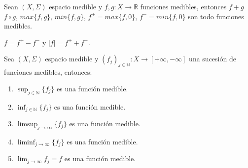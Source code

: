 \begin{corolario}
    Sean $(X, \Sigma)$ espacio medible y $f, g: X \to \mathbb{R}$ funciones medibles, entonces $f + g$ $f \circ g$, $max\{f, g\}$, $min\{f, g\}$, $f^+=max\{f, 0\}$, $f^- = min\{f, 0\}$ son todo funciones medibles.
\end{corolario}
\begin{observación}
    $f = f^+ - f^-$ y $|f| = f^+ + f^-.$
\end{observación}
\begin{teorema}
    Sea $(X, \Sigma)$ espacio medible y $(f_j)_{j \in \mathbb{N}}: X \to [+\infty, -\infty]$ una sucesión de funciones medibles, entonces: 
    \begin{enumerate}
        \item $\sup_{j \in \mathbb{N}}\{f_j\}$ es una función medible.
        \item $\inf_{j \in \mathbb{N}}\{f_j\}$ es una función medible.
        \item $\limsup_{j \to \infty}\{f_j\}$ es una función medible. 
        \item $\liminf_{j \to \infty}\{f_j\}$ es una función medible.
        \item $\lim_{j \to \infty}f_j = f$ es una función medible.
    \end{enumerate}
\end{teorema}

